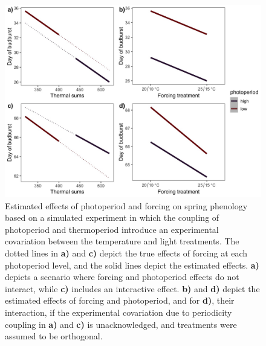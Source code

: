 \documentclass[11pt]{article}
\begin{document}
 \begin{figure}[h!]
    \centering
 \includegraphics[width=.8\textwidth]{..//Plots/periodicity_figures/apparent.jpeg}
    \caption{Estimated effects of photoperiod and forcing on spring phenology based on a simulated experiment in which the coupling of photoperiod and thermoperiod introduce an experimental covariation between the temperature and light treatments. The dotted lines in \textbf{a)} and \textbf{c)} depict the true effects of forcing at each photoperiod level, and the solid lines depict the estimated effects. \textbf{a)} depicts a scenario where forcing and photoperiod effects do not interact, while \textbf{c)} includes an interactive effect. \textbf{b)} and \textbf{d)} depict the estimated effects of forcing and photoperiod, and for \textbf{d)}, their interaction, if the experimental covariation due to periodicity coupling in \textbf{a)} and \textbf{c)} is unacknowledged, and treatments were assumed to be orthogonal.}
    \label{fig:3d}
\end{figure}
 
\end{document}
